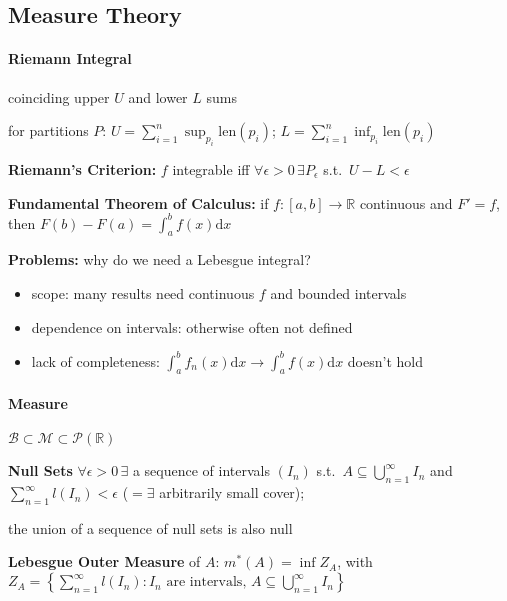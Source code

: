 \documentclass[8pt,twoside]{extarticle}
\begin{document}
\subsection[Measure Theory]{Measure Theory \citep{capinski_measure_2004}}

\begin{multicols}{2}


\paragraph{Riemann Integral} coinciding upper $U$ and lower $L$ sums

for partitions $P$: $U=\sum_{i=1}^n \sup_{p_i} \mathrm{len}(p_i)$; $L=\sum_{i=1}^n \inf_{p_i} \mathrm{len}(p_i)$

\textbf{Riemann's Criterion:} $f$ integrable iff $\forall \epsilon> 0 \,\exists P_\epsilon$ s.t.\ $U{-}L <\epsilon$

\textbf{Fundamental Theorem of Calculus:} if $f:[a,b]\to \mathbb{R}$ continuous and $F'=f$, then $F(b)-F(a)=\int_a^bf(x)\mathrm{d} x$

\textbf{Problems:} why do we need a Lebesgue integral?
\begin{itemize}[itemsep=0em, topsep=0pt, partopsep=0pt,parsep=0pt, leftmargin=1.0em]
\item scope: many results need continuous $f$ and bounded intervals
\item dependence on intervals: otherwise often not defined
\item lack of completeness: $\int_a^b f_n(x) \mathrm{d}x \to \int_a^b f(x) \mathrm{d}x$ doesn't hold
\end{itemize} 

\paragraph{Measure} $\mathcal{B}\subset\mathcal{M}\subset\mathcal{P}(\mathbb{R})$

\textbf{Null Sets} $\forall \epsilon>0 \,\exists$ a sequence of intervals $(I_n)$ s.t.\ \newline $A\subseteq \bigcup_{n=1}^\infty I_n$ and $\sum_{n=1}^\infty l(I_n)<\epsilon$ ($=\exists$ arbitrarily small cover);

the union of a sequence of null sets is also null

\textbf{Lebesgue Outer Measure} of $A$: $m^*(A)=\inf Z_A$, with 
$Z_A = \left\{ \sum_{n=1}^\infty l(I_n): I_n \text{ are intervals, } A\subseteq \bigcup_{n=1}^\infty I_n \right\}$


\end{multicols}
\end{document}
